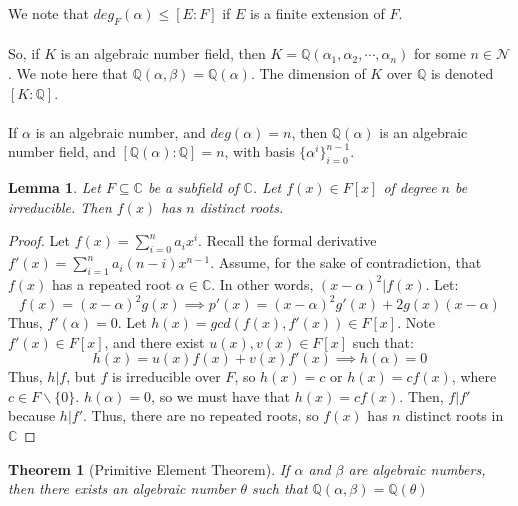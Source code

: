 \documentclass{article}
\newcommand{\C}{\mathbb{C}}
\newcommand{\Q}{\mathbb{Q}}
\newcommand{\N}{\mathcal{N}}
\newtheorem{theorem}{Theorem}[subsection]
\newtheorem{lemma}{Lemma}[subsection]
\begin{document}
\noindent We note that $deg_F(\alpha)\leq [E:F]$ if $E$ is a finite extension of $F$.\\
\\
So, if $K$ is an algebraic number field, then $K=\Q(\alpha_1,\alpha_2,\cdots,\alpha_n)$ for some $n\in\N$. We note here that $\Q(\alpha,\beta)=\Q(\alpha)$. The dimension of $K$ over $\Q$ is denoted $[K:\Q]$.\\
\\
\noindent If $\alpha$ is an algebraic number, and $deg(\alpha)=n$, then $\Q(\alpha)$ is an algebraic number field, and $[\Q(\alpha):\Q]=n$, with basis $\{\alpha^i\}_{i=0}^{n-1}$.
\begin{lemma}
Let $F\subseteq \C$ be a subfield of $\C$. Let $f(x)\in F[x]$ of degree $n$ be irreducible. Then $f(x)$ has $n$ distinct roots.
\end{lemma}
\begin{proof}
Let $f(x)=\displaystyle \sum_{i=0}^n a_ix^i$. Recall the formal derivative $f'(x)=\displaystyle \sum_{i=1}^n a_i(n-i)x^{n-1}$. Assume, for the sake of contradiction, that $f(x)$ has a repeated root $\alpha\in \C$. In other words, $(x-\alpha)^2|f(x)$. Let:
$$f(x)=(x-\alpha)^2g(x)\implies p'(x)=(x-\alpha)^2g'(x)+2g(x)(x-\alpha)$$
Thus, $f'(\alpha)=0$. Let $h(x)=gcd(f(x),f'(x))\in F[x]$. Note $f'(x)\in F[x]$, and there exist $u(x),v(x)\in F[x]$ such that:
$$h(x)=u(x)f(x)+v(x)f'(x)\implies h(\alpha)=0$$
Thus, $h|f$, but $f$ is irreducible over $F$, so $h(x)=c$ or $h(x)=cf(x)$, where $c\in F\backslash \{0\}$. $h(\alpha)=0$, so we must have that $h(x)=cf(x)$. Then, $f|f'$ because $h|f'$. Thus, there are no repeated roots, so $f(x)$ has $n$ distinct roots in $\C$
\end{proof}
\begin{theorem}[Primitive Element Theorem]
If $\alpha$ and $\beta$ are algebraic numbers, then there exists an algebraic number $\theta$ such that $\Q(\alpha,\beta)=\Q(\theta)$
\end{theorem}
\end{document}
